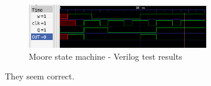 \begin{figure}[H]
    \begin{centering}
    \includegraphics[width=0.7\textwidth]{data/Graficos3/3b.png}
    \par\end{centering}
    \caption{Moore state machine - Verilog test results}
\end{figure}

They seem correct.



